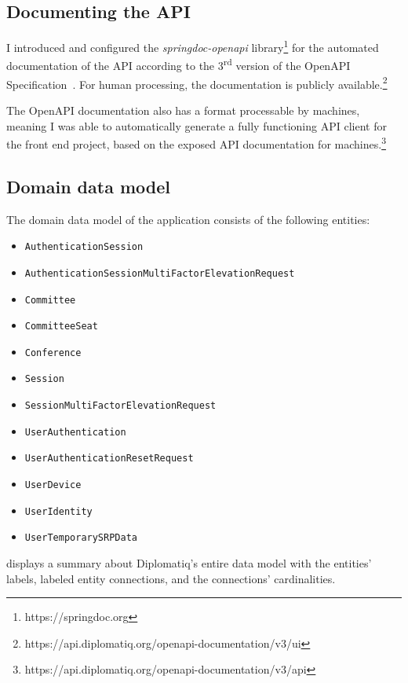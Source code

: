 \subsection{Documenting the API}

I introduced and configured the \emph{springdoc-openapi} library\footnote{https://springdoc.org} for the automated documentation of the API according to the 3\textsuperscript{rd} version of the OpenAPI Specification~\cite{openapi-spec}. For human processing, the documentation is publicly available.\footnote{https://api.diplomatiq.org/openapi-documentation/v3/ui}

The OpenAPI documentation also has a format processable by machines, meaning I was able to automatically generate a fully functioning API client for the front end project, based on the exposed API documentation for machines.\footnote{https://api.diplomatiq.org/openapi-documentation/v3/api}

\subsection{Domain data model}

The domain data model of the application consists of the following entities:

\begin{itemize}
\item \lstinline{AuthenticationSession}
\item \lstinline{AuthenticationSessionMultiFactorElevationRequest}
\item \lstinline{Committee}
\item \lstinline{CommitteeSeat}
\item \lstinline{Conference}
\item \lstinline{Session}
\item \lstinline{SessionMultiFactorElevationRequest}
\item \lstinline{UserAuthentication}
\item \lstinline{UserAuthenticationResetRequest}
\item \lstinline{UserDevice}
\item \lstinline{UserIdentity}
\item \lstinline{UserTemporarySRPData}
\end{itemize}

 displays a summary about Diplomatiq's entire data model with the entities' labels, labeled entity connections, and the connections' cardinalities.


